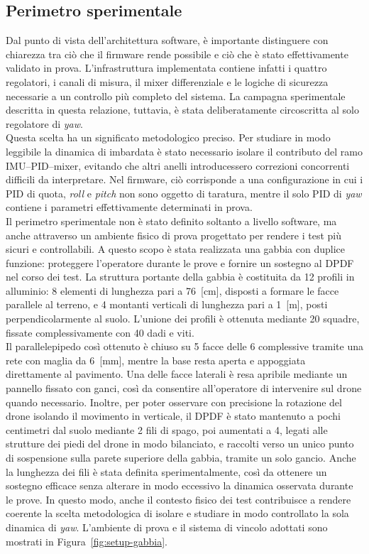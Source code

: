 \documentclass[11pt]{report}
\begin{document}
	\subsection{Perimetro sperimentale}
	Dal punto di vista dell'architettura software, è importante distinguere con chiarezza tra ciò che il firmware rende possibile e ciò che è stato effettivamente validato in prova. L'infrastruttura implementata contiene infatti i quattro regolatori, i canali di misura, il mixer differenziale e le logiche di sicurezza necessarie a un controllo più completo del sistema. La campagna sperimentale descritta in questa relazione, tuttavia, è stata deliberatamente circoscritta al solo regolatore di \textit{yaw}.\\
	Questa scelta ha un significato metodologico preciso. Per studiare in modo leggibile la dinamica di imbardata è stato necessario isolare il contributo del ramo IMU--PID--mixer, evitando che altri anelli introducessero correzioni concorrenti difficili da interpretare. Nel firmware, ciò corrisponde a una configurazione in cui i PID di quota, \textit{roll} e \textit{pitch} non sono oggetto di taratura, mentre il solo PID di \textit{yaw} contiene i parametri effettivamente determinati in prova.\\
	Il perimetro sperimentale non è stato definito soltanto a livello software, ma anche attraverso un ambiente fisico di prova progettato per rendere i test più sicuri e controllabili. A questo scopo è stata realizzata una gabbia con duplice funzione: proteggere l'operatore durante le prove e fornire un sostegno al DPDF nel corso dei test. La struttura portante della gabbia è costituita da 12 profili in alluminio: 8 elementi di lunghezza pari a 76~[cm], disposti a formare le facce parallele al terreno, e 4 montanti verticali di lunghezza pari a 1~[m], posti perpendicolarmente al suolo. L'unione dei profili è ottenuta mediante 20 squadre, fissate complessivamente con 40 dadi e viti.\\
	Il parallelepipedo così ottenuto è chiuso su 5 facce delle 6 complessive tramite una rete con maglia da 6~[mm], mentre la base resta aperta e appoggiata direttamente al pavimento. Una delle facce laterali è resa apribile mediante un pannello fissato con ganci, così da consentire all'operatore di intervenire sul drone quando necessario. Inoltre, per poter osservare con precisione la rotazione del drone isolando il movimento in verticale, il DPDF è stato mantenuto a pochi centimetri dal suolo mediante 2 fili di spago, poi aumentati a 4, legati alle strutture dei piedi del drone in modo bilanciato, e raccolti verso un unico punto di sospensione sulla parete superiore della gabbia, tramite un solo gancio. Anche la lunghezza dei fili è stata definita sperimentalmente, così da ottenere un sostegno efficace senza alterare in modo eccessivo la dinamica osservata durante le prove. In questo modo, anche il contesto fisico dei test contribuisce a rendere coerente la scelta metodologica di isolare e studiare in modo controllato la sola dinamica di \textit{yaw}. L'ambiente di prova e il sistema di vincolo adottati sono mostrati in Figura~\ref{fig:setup-gabbia}.
\end{document}

